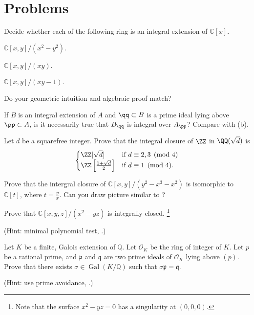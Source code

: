\section{Problems}
\begin{problem}
Decide whether each of the following ring is an integral extension of $\mathbb C[x]$.
\begin{alphenum}
\item $\mathbb C[x,y]/(x^2-y^2)$.
\item $\mathbb C[x,y]/(xy)$.
\item $\mathbb C[x,y]/(xy-1)$.
\end{alphenum}
Do your geometric intuition and algebraic proof match?
\end{problem}
\begin{problem}
If $B$ is an integral extension of $A$ and $\qq\subset B$
is a prime ideal lying above $\pp\subset A$,
is it necessarily true that $B_\qq$ is integral over $A_\pp$?
Compare with  (b).
\end{problem}
\begin{problem}
Let $d$ be a squarefree integer. 
Prove that the integral closure of $\ZZ$ in $\QQ(\sqrt d)$ is 
$$\begin{cases}
    \ZZ[\sqrt d] & \text{if } d\equiv 2,3\pmod 4 \\
    \ZZ\left[\tfrac{1+\sqrt d}2\right] & 
    \text{if } d\equiv 1\pmod 4.
\end{cases}$$
\end{problem}
\begin{problem}
Prove that the intergral closure of $\mathbb C[x,y]/(y^2-x^3-x^2)$
is isomorphic to $\mathbb C[t]$, where $t=\frac yx$.
Can you draw picture similar to ?
\end{problem}
\begin{problem} 
\label{prob:integrally_closed}
Prove that $\mathbb C[x,y,z]/(x^2-yz)$ is integrally closed.%
\footnote{Note that the surface $x^2-yz=0$ has a singularity at $(0,0,0)$.}

(Hint: minimal polynomial test, .)
\end{problem}
\begin{problem} 
Let $K$ be a finite, Galois extension of $\mathbb Q$. Let $\mathcal O_K$ be the ring of integer of $K$. Let $p$ be a rational prime, and $\mathfrak p$ and $\mathfrak q$ are two prime ideals of $\mathcal O_K$ lying above $(p)$. Prove that there exists $\sigma\in\operatorname{Gal}(K/\mathbb Q)$ such that $\sigma\mathfrak p = \mathfrak q$.

(Hint: use prime avoidance, .)
\end{problem}
